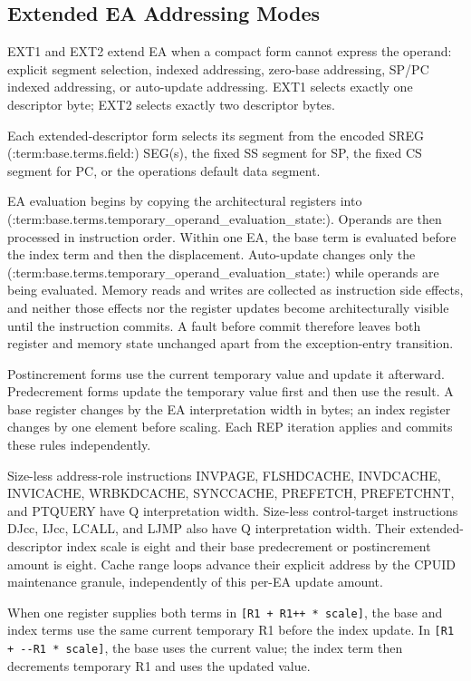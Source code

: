\subsection{Extended EA Addressing Modes}\label{section:extended-ea-addressing}
EXT1 and EXT2 extend EA when a compact form cannot express the operand: explicit segment selection, indexed addressing,
zero-base addressing, SP/PC indexed addressing, or auto-update addressing. EXT1 selects exactly one descriptor byte;
EXT2 selects exactly two descriptor bytes.

Each extended-descriptor form selects its segment from the encoded SREG (:term:base.terms.field:) SEG(s), the fixed SS segment for SP, the fixed CS
segment for PC, or the operation\textquotesingle{}s default data segment.

EA evaluation begins by copying the architectural registers into (:term:base.terms.temporary_operand_evaluation_state:). Operands are
then processed in instruction order. Within one EA, the base term is evaluated before the index term and then the
displacement. Auto-update changes only the (:term:base.terms.temporary_operand_evaluation_state:) while operands are being evaluated. Memory reads and
writes are collected as instruction side effects, and neither those effects nor the register updates become
architecturally visible until the instruction commits. A fault before commit therefore leaves both register and
memory state unchanged apart from the exception-entry transition.

Postincrement forms use the current temporary value and update it afterward. Predecrement forms update the temporary
value first and then use the result. A base register changes by the EA interpretation width in bytes; an index
register changes by one element before scaling. Each REP iteration applies and commits these rules independently.

Size-less address-role instructions INVPAGE, FLSHDCACHE, INVDCACHE, INVICACHE, WRBKDCACHE, SYNCCACHE, PREFETCH,
PREFETCHNT, and PTQUERY have Q interpretation width. Size-less control-target instructions DJcc, IJcc,
LCALL, and LJMP also have Q interpretation width. Their extended-descriptor index scale is eight and their base predecrement or
postincrement amount is eight. Cache range loops advance their explicit address by the CPUID maintenance granule,
independently of this per-EA update amount.

When one register supplies both terms in \texttt{[R1 + R1++ * scale]}, the base and index terms use the same
current temporary R1 before the index update. In \texttt{[R1 + {-}{-}R1 * scale]}, the base uses the current value;
the index term then decrements temporary R1 and uses the updated value.

